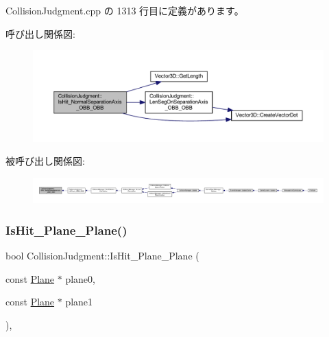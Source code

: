  Collision\+Judgment.\+cpp の 1313 行目に定義があります。

呼び出し関係図\+:\nopagebreak
\begin{figure}[H]
\begin{center}
\leavevmode
\includegraphics[width=350pt]{class_collision_judgment_abb475bce4c67d02d0964355aa60f1362_cgraph}
\end{center}
\end{figure}
被呼び出し関係図\+:
\nopagebreak
\begin{figure}[H]
\begin{center}
\leavevmode
\includegraphics[width=350pt]{class_collision_judgment_abb475bce4c67d02d0964355aa60f1362_icgraph}
\end{center}
\end{figure}
\mbox{\label{class_collision_judgment_a549042895226422e8551afff35519a59}} 
\subsubsection{\texorpdfstring{Is\+Hit\+\_\+\+Plane\+\_\+\+Plane()}{IsHit\_Plane\_Plane()}}
{\footnotesize\ttfamily bool Collision\+Judgment\+::\+Is\+Hit\+\_\+\+Plane\+\_\+\+Plane (\begin{DoxyParamCaption}\item[{const \mbox{\hyperlink{class_plane}{Plane}} $\ast$}]{plane0,  }\item[{const \mbox{\hyperlink{class_plane}{Plane}} $\ast$}]{plane1 }\end{DoxyParamCaption})\hspace{0.3cm}{\ttfamily [static]}, {\ttfamily [private]}}



